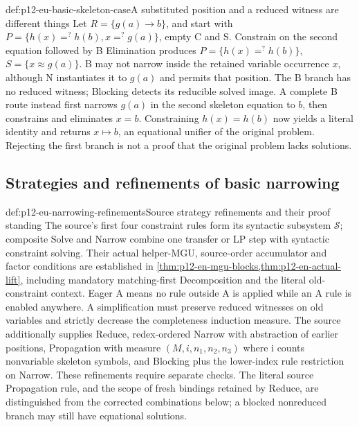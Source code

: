 \begin{hbexample}{def:p12-eu-basic-skeleton-case}{A substituted position and a reduced witness are different things}
Let \(R=\{g(a)\to b\}\), and start with
\(P=\{h(x)=^{?}h(b),x=^{?}g(a)\}\), empty C and S.
Constrain on the second equation followed by B Elimination produces
\(P=\{h(x)=^{?}h(b)\}\), \(S=\{x\approx g(a)\}\).
B may not narrow inside the retained variable occurrence \(x\),
although N instantiates it to \(g(a)\) and permits that position.
The B branch has no reduced witness; Blocking detects its reducible
solved image. A complete B route instead first narrows \(g(a)\)
in the second skeleton equation to \(b\), then constrains and
eliminates \(x=b\). Constraining \(h(x)=h(b)\) now yields a
literal identity and returns \(x\mapsto b\), an equational unifier
of the original problem. Rejecting the first branch is not a proof
that the original problem lacks solutions.
\end{hbexample}





\subsection{Strategies and refinements of basic narrowing}

\begin{hbdefinition}{def:p12-eu-narrowing-refinements}{Source strategy refinements and their proof standing}
The source's first four constraint rules form its syntactic subsystem
\(\mathcal S\); composite Solve and Narrow combine one transfer or
LP step with syntactic constraint solving. Their actual helper-MGU,
source-order accumulator and factor conditions are established in
\cref{thm:p12-en-mgu-blocks,thm:p12-en-actual-lift}, including
mandatory matching-first Decomposition and the literal old-constraint
context. Eager A means no rule
outside A is applied while an A rule is enabled anywhere. A
simplification must preserve reduced witnesses on old variables and
strictly decrease the completeness induction measure. The source
additionally supplies Reduce, redex-ordered Narrow with abstraction
of earlier positions, Propagation with measure
\((M,i,n_1,n_2,n_3)\) where i counts nonvariable skeleton symbols,
and Blocking plus the lower-index rule restriction on Narrow.
These refinements require separate checks. The literal source
Propagation rule, and the scope of fresh bindings retained by Reduce,
are distinguished from the corrected combinations below; a blocked
nonreduced branch may still have equational solutions.
\cite[Definitions 4.15--4.16, Theorem 4.17, Proposition 4.18,
\S4.4.3--4.4.4, pp.~499--503]{BaaderSnyder2001}
\end{hbdefinition}

